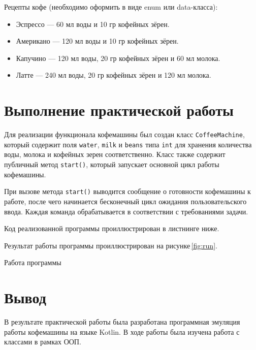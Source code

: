Рецепты кофе (необходимо оформить в виде enum или data-класса):
\begin{itemize}
	\item Эспрессо --- 60 мл воды и 10 гр кофейных зёрен.
	\item Американо --- 120 мл воды и 10 гр кофейных зёрен.
	\item Капучино --- 120 мл воды, 20 гр кофейных зёрен и 60 мл молока.
	\item Латте --- 240 мл воды, 20 гр кофейных зёрен и 120 мл молока.
\end{itemize}

\clearpage

\section*{\LARGE Выполнение практической работы}

Для реализации функционала кофемашины был создан класс \texttt{CoffeeMachine},
который содержит поля \texttt{water}, \texttt{milk} и \texttt{beans}
типа \texttt{int} для хранения количества воды,
молока и кофейных зерен соответственно.
Класс также содержит публичный метод \texttt{start()},
который запускает основной цикл работы кофемашины.\par
При вызове метода \texttt{start()} выводится сообщение о готовности кофемашины
к работе, после чего начинается бесконечный цикл
ожидания пользовательского ввода.
Каждая команда обрабатывается в соответствии с требованиями задачи.\par
Код реализованной программы проиллюстрирован в листнинге ниже.



Результат работы программы проиллюстрирован на рисунке\,\ref{fig:run}.

\begin{image}
	\caption{Работа программы}
	\label{fig:run}
\end{image}

\clearpage

\section*{\LARGE Вывод}
В результате практической работы была разработана программная эмуляция
работы кофемашины на языке Kotlin.
В ходе работы была изучена работа с классами в рамках ООП.

